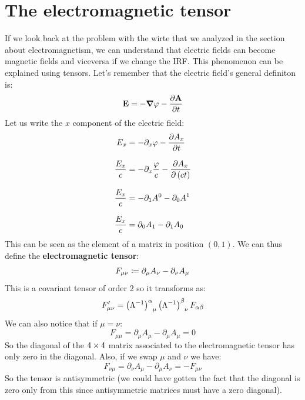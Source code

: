 \section{The electromagnetic tensor}
If we look back at the problem with the wirte that we analyzed in the section about electromagnetism, we can understand that electric fields can become magnetic fields and viceversa if we change the IRF. This phenomenon can be explained using tensors. Let's remember that the electric field's general definiton is:
\begin{equation}
  \vec{E} = -\grad{\potE} - \pdv{\vec{A}}{t}
\end{equation}
Let us write the $x$ component of the electric field:
\begin{equation}
  \begin{split}
    E_x &= -\partial_x \potE - \pdv{A_x}{t} \\[8pt]
    \dfrac{E_x}{c} &= -\partial_x \dfrac{\potE}{c} - \pdv{A_x}{\brackets{ct}} \\[8pt]
    \dfrac{E_x}{c} &= -\partial_1 A^0 - \partial_0 A^1 \\[8pt]
    \dfrac{E_x}{c} &= \partial_0 A_1 - \partial_1 A_0
  \end{split}
\end{equation}
This can be seen as the element of a matrix in position $(0,1)$. We can thus define the \textbf{electromagnetic tensor}:
\begin{equation}
  F_{\mu\nu} \coloneqq \partial_{\mu}A_{\nu} - \partial_{\nu}A_{\mu}
\end{equation}
This is a covariant tensor of order 2 so it transforms as:
\begin{equation}
  F'_{\mu\nu} = \tensor{\brackets{\lm^{-1}}}{^{\alpha}_{\mu}}\tensor{\brackets{\lm^{-1}}}{^{\beta}_{\nu}}F_{\alpha\beta}
\end{equation}
We can also notice that if $\mu = \nu$:
\begin{equation}
  F_{\mu\mu} = \partial_{\mu}A_{\mu} - \partial_{\mu}A_{\mu} = 0
\end{equation}
So the diagonal of the $4 \times 4$ matrix associated to the electromagnetic tensor has only zero in the diagonal. Also, if we swap $\mu$ and $\nu$ we have:
\begin{equation}
  F_{\nu\mu} = \partial_{\nu}A_{\mu} - \partial_{\mu}A_{\nu} = -F_{\mu\nu}
\end{equation}
So the tensor is antisymmetric (we could have gotten the fact that the diagonal is zero only from this since antisymmetric matrices must have a zero diagonal).\\
